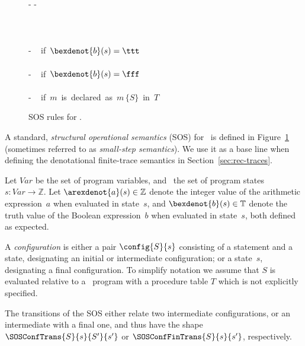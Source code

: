 \documentclass[a4paper,numberwithinsect]{lipics-v2021}
\newcommand{\bordertext}[1]{
\setlength{\fboxsep}{5pt}%
\setlength{\fboxrule}{0.5pt}%
\fbox{\parbox[c]{0.95\textwidth}{#1}}
}
\begin{document}
\begin{figure}
\centering
{}
  {-}
  {} \quad
{}
  {-}
  {} \\~\\

  {}
  {} \quad
{}
  {}
  {} \\~\\

  {-}
  {}~
  \mbox{if $\bexdenot{b} (s) = \ttt$} \\~\\

  {-}
  {}~
  \mbox{if $\bexdenot{b} (s) = \fff$} \\~\\

  {-}
  {}~
  \mbox{if $m$ is declared as $m\,\{S\}$ in $T$}
\caption{\label{fig:rec-sos}SOS rules for \Rec.}
\end{figure}

A standard, \emph{structural operational semantics} (SOS) for \Rec\ is
defined in Figure~\ref{fig:rec-sos} (sometimes referred to as
\emph{small-step semantics}).
%
We use it as a base line when defining the denotational finite-trace
semantics in Section~\ref{sec:rec-traces}.

Let $\mathit{Var}$ be the set of program variables, and \State\ the
set of program states $s : \mathit{Var} \rightarrow \mathbb{Z}$.
%
Let $\arexdenot{a} (s) \in \mathbb{Z}$ denote the integer value of the 
arithmetic expression~$a$ when evaluated in state~$s$, and
$\bexdenot{b} (s) \in \mathbb{T}$ denote the truth value of the Boolean
expression~$b$ when evaluated in state~$s$, both defined as expected.

A \emph{configuration} is either a pair $\config{S}{s}$ consisting of
a statement and a state, designating an initial or intermediate
configuration; or a state~$s$, designating a final configuration.  To
simplify notation we assume that $S$ is evaluated relative to a \Rec\
program with a procedure table $T$ which is not explicitly specified.

The transitions of the SOS either relate two intermediate configurations,
or an intermediate with a final one, and thus have the shape
$\SOSConfTrans{S}{s}{S'}{s'}$ or $\SOSConfFinTrans{S}{s}{s'}$, 
respectively.
\end{document}
